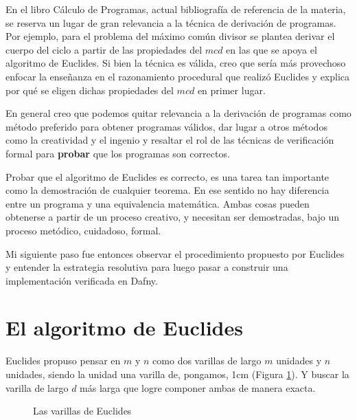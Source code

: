 \documentclass[12pt, a4paper, openany, fleqn]{book}
\begin{document}
    En el libro Cálculo de Programas, actual bibliografía de referencia de la materia, se reserva un lugar de gran relevancia a la técnica de derivación de programas. Por ejemplo, para el problema del máximo común divisor se plantea derivar el cuerpo del ciclo a partir de las propiedades del $mcd$ en las que se apoya el algoritmo de Euclides.
    Si bien la técnica es válida, creo que sería más provechoso enfocar la enseñanza en el razonamiento procedural que realizó Euclides y explica por qué se eligen dichas propiedades del $mcd$ en primer lugar.

    En general creo que podemos quitar relevancia a la derivación de programas como método preferido para obtener programas válidos, dar lugar a otros métodos como la creatividad y el ingenio y resaltar el rol de las técnicas de verificación formal para \textbf{probar} que los programas son correctos.

    Probar que el algoritmo de Euclides es correcto, es una tarea tan importante como la demostración de cualquier teorema. En ese sentido no hay diferencia entre un programa y una equivalencia matemática. Ambas cosas pueden obtenerse a partir de un proceso creativo, y necesitan ser demostradas, bajo un proceso metódico, cuidadoso, formal.

    Mi siguiente paso fue entonces observar el procedimiento propuesto por Euclides y entender la estrategia resolutiva para luego pasar a construir una implementación verificada en Dafny.

    \section{El algoritmo de Euclides}
    \label{desarrollo_euclides}
    Euclides propuso pensar en $m$ y $n$ como dos varillas de largo $m$ unidades y $n$ unidades, siendo la unidad una varilla de, pongamos, 1cm (Figura \ref{varillas_euclides}).
    Y buscar la varilla de largo $d$ más larga que logre componer ambas de manera exacta.
    
    \begin{figure}[h]
        \centering
        \caption{Las varillas de Euclides} \label{varillas_euclides}
    \end{figure}
\end{document}
